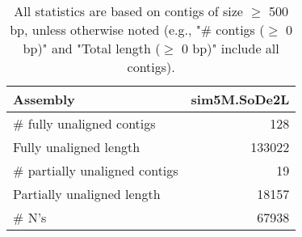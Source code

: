 \documentclass[12pt,a4paper]{article}
\begin{document}
\begin{table}[ht]
\begin{center}
\caption{All statistics are based on contigs of size $\geq$ 500 bp, unless otherwise noted (e.g., "\# contigs ($\geq$ 0 bp)" and "Total length ($\geq$ 0 bp)" include all contigs).}
\begin{tabular}{|l*{1}{|r}|}
\hline
Assembly & sim5M.SoDe2L \\ \hline
\# fully unaligned contigs & 128 \\ \hline
Fully unaligned length & 133022 \\ \hline
\# partially unaligned contigs & 19 \\ \hline
Partially unaligned length & 18157 \\ \hline
\# N's & 67938 \\ \hline
\end{tabular}
\end{center}
\end{table}
\end{document}
